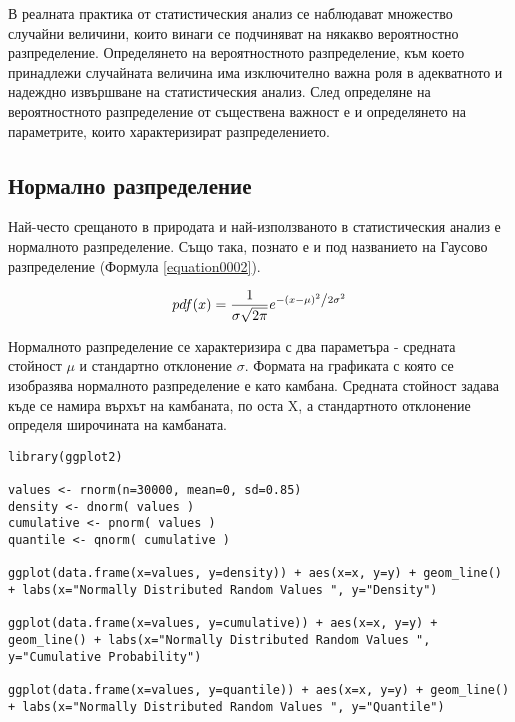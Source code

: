 В реалната практика от статистическия анализ се наблюдават множество случайни величини, които винаги се подчиняват на някакво вероятностно разпределение. Определянето на вероятностното разпределение, към което принадлежи случайната величина има изключително важна роля в адекватното и надеждно извършване на статистическия анализ. След определяне на вероятностното разпределение от съществена важност е и определянето на параметрите, които характеризират разпределението.  

\subsection{Нормално разпределение}

Най-често срещаното в природата и най-използваното в статистическия анализ е нормалното разпределение. Също така, познато е и под названието на Гаусово разпределение (Формула \ref{equation0002}). 

\begin{equation}
pdf(x) = \frac{1}{{\sigma \sqrt {2\pi } }}e^{{{ - \left( {x - \mu } \right)^2 } \mathord{\left/ {\vphantom {{ - \left( {x - \mu } \right)^2 } {2\sigma ^2 }}} \right. \kern-\nulldelimiterspace} {2\sigma ^2 }}}
\label{equation0002}
\end{equation}

Нормалното разпределение се характеризира с два параметъра - средната стойност $\mu$ и стандартно отклонение $\sigma$. Формата на графиката с която се изобразява нормалното разпределение е като камбана. Средната стойност задава къде се намира върхът на камбаната, по оста X, а стандартното отклонение определя широчината на камбаната. 

\begin{lstlisting}[caption=Нормално разпределение, label=listing0157]
library(ggplot2)

values <- rnorm(n=30000, mean=0, sd=0.85)
density <- dnorm( values )
cumulative <- pnorm( values )
quantile <- qnorm( cumulative )

ggplot(data.frame(x=values, y=density)) + aes(x=x, y=y) + geom_line() + labs(x="Normally Distributed Random Values ", y="Density")

ggplot(data.frame(x=values, y=cumulative)) + aes(x=x, y=y) + geom_line() + labs(x="Normally Distributed Random Values ", y="Cumulative Probability")

ggplot(data.frame(x=values, y=quantile)) + aes(x=x, y=y) + geom_line() + labs(x="Normally Distributed Random Values ", y="Quantile")
\end{lstlisting}

